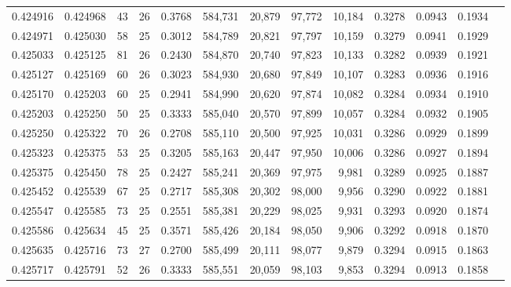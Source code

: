 \begin{tabular}{rrrrrrrrrrrrr}
0.424916 & 0.424968 &    43 &  26 &                                     0.3768 & 584,731 &  20,879 &  97,772 &  10,184 & 0.3278 & 0.0943 & 0.1934 \\
0.424971 & 0.425030 &    58 &  25 &                                     0.3012 & 584,789 &  20,821 &  97,797 &  10,159 & 0.3279 & 0.0941 & 0.1929 \\
0.425033 & 0.425125 &    81 &  26 &                                     0.2430 & 584,870 &  20,740 &  97,823 &  10,133 & 0.3282 & 0.0939 & 0.1921 \\
0.425127 & 0.425169 &    60 &  26 &                                     0.3023 & 584,930 &  20,680 &  97,849 &  10,107 & 0.3283 & 0.0936 & 0.1916 \\
0.425170 & 0.425203 &    60 &  25 &                                     0.2941 & 584,990 &  20,620 &  97,874 &  10,082 & 0.3284 & 0.0934 & 0.1910 \\
0.425203 & 0.425250 &    50 &  25 &                                     0.3333 & 585,040 &  20,570 &  97,899 &  10,057 & 0.3284 & 0.0932 & 0.1905 \\
0.425250 & 0.425322 &    70 &  26 &                                     0.2708 & 585,110 &  20,500 &  97,925 &  10,031 & 0.3286 & 0.0929 & 0.1899 \\
0.425323 & 0.425375 &    53 &  25 &                                     0.3205 & 585,163 &  20,447 &  97,950 &  10,006 & 0.3286 & 0.0927 & 0.1894 \\
0.425375 & 0.425450 &    78 &  25 &                                     0.2427 & 585,241 &  20,369 &  97,975 &   9,981 & 0.3289 & 0.0925 & 0.1887 \\
0.425452 & 0.425539 &    67 &  25 &                                     0.2717 & 585,308 &  20,302 &  98,000 &   9,956 & 0.3290 & 0.0922 & 0.1881 \\
0.425547 & 0.425585 &    73 &  25 &                                     0.2551 & 585,381 &  20,229 &  98,025 &   9,931 & 0.3293 & 0.0920 & 0.1874 \\
0.425586 & 0.425634 &    45 &  25 &                                     0.3571 & 585,426 &  20,184 &  98,050 &   9,906 & 0.3292 & 0.0918 & 0.1870 \\
0.425635 & 0.425716 &    73 &  27 &                                     0.2700 & 585,499 &  20,111 &  98,077 &   9,879 & 0.3294 & 0.0915 & 0.1863 \\
0.425717 & 0.425791 &    52 &  26 &                                     0.3333 & 585,551 &  20,059 &  98,103 &   9,853 & 0.3294 & 0.0913 & 0.1858 \\

\end{tabular}
